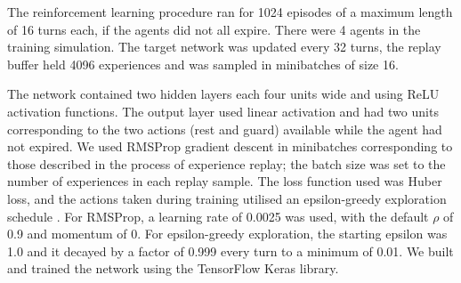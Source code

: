 The reinforcement learning procedure ran for 1024 episodes of a maximum length
of 16 turns each, if the agents did not all expire. There were 4 agents in the
training simulation. The target network was updated every 32 turns, the replay
buffer held 4096 experiences and was sampled in minibatches of size 16.

The network contained two hidden layers each four units wide and using ReLU
activation functions. The output layer used linear activation and had two units
corresponding to the two actions (rest and guard) available while the agent had
not expired. We used RMSProp gradient descent in minibatches corresponding to
those described in the process of experience replay; the batch size was set to
the number of experiences in each replay sample. The loss function used was
Huber loss, and the actions taken during training utilised an epsilon-greedy
exploration schedule \cite{Mnih+15,HaaseltGS16}.
%
For RMSProp, a learning rate of 0.0025 was used, with the default $\rho$ of 0.9
and momentum of 0. For epsilon-greedy exploration, the starting epsilon was 1.0
and it decayed by a factor of 0.999 every turn to a minimum of 0.01. We built
and trained the network using the TensorFlow Keras library.

